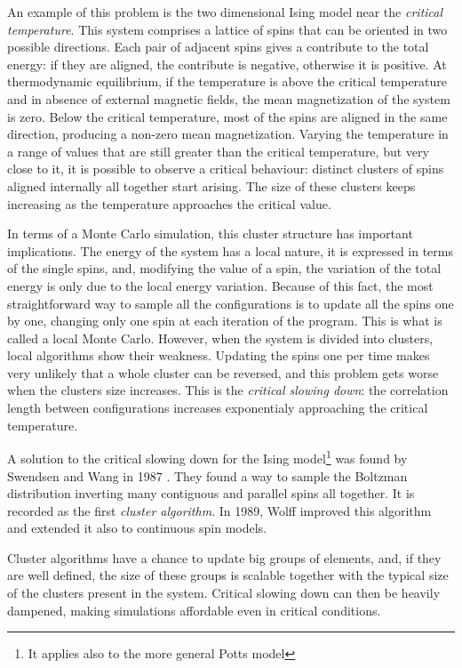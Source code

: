 An example of this problem is the two dimensional Ising model near the \emph{critical temperature}.
This system comprises a lattice of spins that can be oriented in two possible directions.
Each pair of adjacent spins gives a contribute to the total energy: if they are aligned, the contribute is negative, otherwise it is positive.
At thermodynamic equilibrium, if the temperature is above the critical temperature and in absence of external magnetic fields, the mean magnetization of the system is zero.
Below the critical temperature, most of the spins are aligned in the same direction, producing a non-zero mean magnetization.
Varying the temperature in a range of values that are still greater than the critical temperature, but very close to it,
it is possible to observe a critical behaviour: distinct clusters of spins aligned internally all together start arising.
The size of these clusters keeps increasing as the temperature approaches the critical value.

In terms of a Monte Carlo simulation, this cluster structure has important implications.
The energy of the system has a local nature,
\ie it is expressed in terms of the single spins, and, modifying the value of a spin,
the variation of the total energy is only due to the local energy variation.
Because of this fact, the most straightforward way to sample all the configurations is to update all the spins one by one,
changing only one spin at each iteration of the program. This is what is called a local Monte Carlo.
However, when the system is divided into clusters, local algorithms show their weakness.
Updating the spins one per time makes very unlikely that a whole cluster can be reversed,
and this problem gets worse when the clusters size increases.
This is the \emph{critical slowing down}: the correlation length between configurations increases exponentialy approaching the critical temperature.

A solution to the critical slowing down for the Ising model\footnote{It applies also to the more general Potts model} was found by Swendsen and Wang in 1987 \cite{swendsen-wang:1987}.
They found a way to sample the Boltzman distribution inverting many contiguous and parallel spins all together.
It is recorded as the first \emph{cluster algorithm}.
In 1989, Wolff \cite{wolff:1989} improved this algorithm and extended it also to continuous spin models.

Cluster algorithms have a chance to update big groups of elements, and, if they are well defined,
the size of these groups is scalable together with the typical size of the clusters present in the system.
Critical slowing down can then be heavily dampened, making simulations affordable even in critical conditions.

